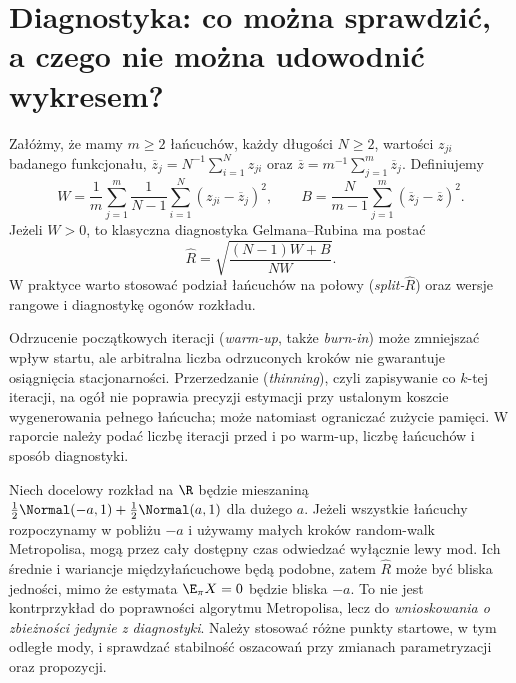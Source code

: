 \section{Diagnostyka: co można sprawdzić, a czego nie można udowodnić wykresem?}
\begin{definicja}
Załóżmy, że mamy $m\ge2$ łańcuchów, każdy długości
$N\ge2$, wartości $z_{ji}$ badanego funkcjonału,
$\overline z_j=N^{-1}\sum_{i=1}^Nz_{ji}$ oraz
$\overline z=m^{-1}\sum_{j=1}^m\overline z_j$.
Definiujemy
\[
 W=\frac1m\sum_{j=1}^m
 \frac1{N-1}\sum_{i=1}^N(z_{ji}-\overline z_j)^2,
 \qquad
 B=\frac N{m-1}\sum_{j=1}^m(\overline z_j-\overline z)^2.
\]
Jeżeli $W>0$, to klasyczna diagnostyka Gelmana--Rubina
ma postać
\[
 \widehat R=\sqrt{\frac{(N-1)W+B}{NW}}.
\]
W praktyce warto stosować podział łańcuchów na połowy
(\emph{split-$\widehat R$}) oraz wersje rangowe
i diagnostykę ogonów rozkładu.
\end{definicja}

\begin{uwaga}
Odrzucenie początkowych iteracji (\emph{warm-up}, także \emph{burn-in})
może zmniejszać wpływ startu, ale arbitralna liczba odrzuconych kroków
nie gwarantuje osiągnięcia stacjonarności. Przerzedzanie (\emph{thinning}),
czyli zapisywanie co $k$-tej iteracji, na ogół nie poprawia
precyzji estymacji przy ustalonym koszcie wygenerowania pełnego łańcucha;
może natomiast ograniczać zużycie pamięci. W raporcie należy podać
liczbę iteracji przed i po warm-up, liczbę łańcuchów i sposób diagnostyki.
\end{uwaga}

\begin{przyklad}
Niech docelowy rozkład na $\R$ będzie mieszaniną
$\tfrac12\Normal(-a,1)+\tfrac12\Normal(a,1)$ dla dużego $a$.
Jeżeli wszystkie łańcuchy rozpoczynamy w pobliżu $-a$ i używamy
małych kroków random-walk Metropolisa, mogą przez cały dostępny
czas odwiedzać wyłącznie lewy mod. Ich średnie i wariancje
międzyłańcuchowe będą podobne, zatem $\widehat R$ może być
bliska jedności, mimo że estymata $\E_\pi X=0$ będzie bliska $-a$.
To nie jest kontrprzykład do poprawności algorytmu Metropolisa,
lecz do \emph{wnioskowania o zbieżności jedynie z diagnostyki}.
Należy stosować różne punkty startowe, w tym odległe mody,
i sprawdzać stabilność oszacowań przy zmianach parametryzacji
oraz propozycji.
\end{przyklad}

